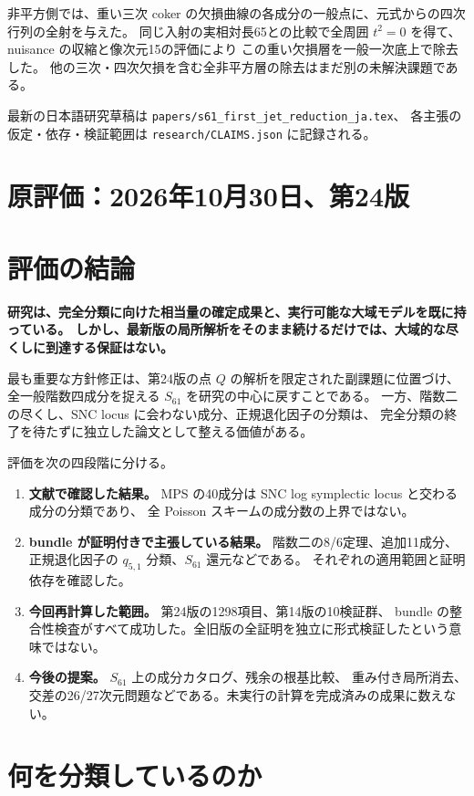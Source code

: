 \documentclass[11pt,a4paper]{ltjsarticle}
\theoremstyle{remark}\newtheorem{remark}[proposition]{注意}
\begin{document}
非平方側では、重い三次 coker の欠損曲線の各成分の一般点に、元式からの四次行列の全射を与えた。
同じ入射の実相対長65との比較で全周囲 $t^2=0$ を得て、nuisance の収縮と像次元15の評価により
この重い欠損層を一般一次底上で除去した\cite{heavy-final-v62}。
他の三次・四次欠損を含む全非平方層の除去はまだ別の未解決課題である。

最新の日本語研究草稿は
\nolinkurl{papers/s61_first_jet_reduction_ja.tex}、
各主張の仮定・依存・検証範囲は
\nolinkurl{research/CLAIMS.json} に記録される。

\section*{原評価：2026年10月30日、第24版}
\section{評価の結論}

\textbf{研究は、完全分類に向けた相当量の確定成果と、実行可能な大域モデルを既に持っている。
しかし、最新版の局所解析をそのまま続けるだけでは、大域的な尽くしに到達する保証はない。}

最も重要な方針修正は、第24版の点 $Q$ の解析を限定された副課題に位置づけ、
全一般階数四成分を捉える $S_{61}$ を研究の中心に戻すことである。
一方、階数二の尽くし、SNC locus に会わない成分、正規退化因子の分類は、
完全分類の終了を待たずに独立した論文として整える価値がある。

評価を次の四段階に分ける。
\begin{enumerate}
\item \textbf{文献で確認した結果。} MPS の40成分は SNC log symplectic locus と交わる成分の分類であり、
全 Poisson スキームの成分数の上界ではない\cite[Theorem 1.4]{MPS}。
\item \textbf{bundle が証明付きで主張している結果。} 階数二の8/6定理、追加11成分、
正規退化因子の $q_{5,1}$ 分類、$S_{61}$ 還元などである。
それぞれの適用範囲と証明依存を確認した。
\item \textbf{今回再計算した範囲。} 第24版の1298項目、第14版の10検証群、
bundle の整合性検査がすべて成功した。全旧版の全証明を独立に形式検証したという意味ではない。
\item \textbf{今後の提案。} $S_{61}$ 上の成分カタログ、残余の根基比較、
重み付き局所消去、交差の26/27次元問題などである。未実行の計算を完成済みの成果に数えない。
\end{enumerate}

\section{何を分類しているのか}
\end{document}
